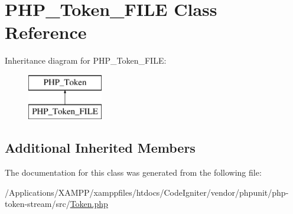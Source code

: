 \hypertarget{class_p_h_p___token___f_i_l_e}{}\section{P\+H\+P\+\_\+\+Token\+\_\+\+F\+I\+LE Class Reference}
\label{class_p_h_p___token___f_i_l_e}
Inheritance diagram for P\+H\+P\+\_\+\+Token\+\_\+\+F\+I\+LE\+:\begin{figure}[H]
\begin{center}
\leavevmode
\includegraphics[height=2.000000cm]{class_p_h_p___token___f_i_l_e}
\end{center}
\end{figure}
\subsection*{Additional Inherited Members}


The documentation for this class was generated from the following file\+:\begin{DoxyCompactItemize}
\item 
/\+Applications/\+X\+A\+M\+P\+P/xamppfiles/htdocs/\+Code\+Igniter/vendor/phpunit/php-\/token-\/stream/src/\mbox{\hyperlink{_token_8php}{Token.\+php}}\end{DoxyCompactItemize}
